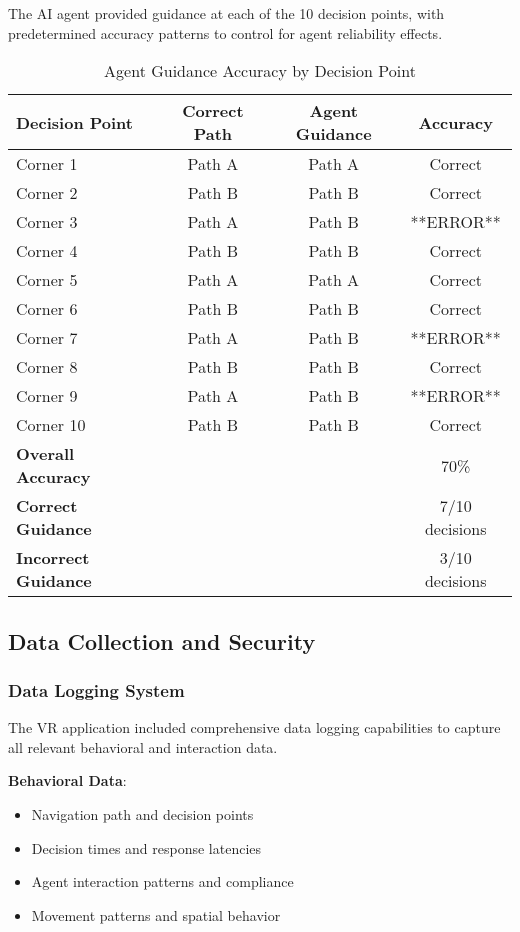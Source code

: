 \documentclass[12pt]{article}
\begin{document}
The AI agent provided guidance at each of the 10 decision points, with predetermined accuracy patterns to control for agent reliability effects.

\begin{table}[h]
\centering
\caption{Agent Guidance Accuracy by Decision Point}
\begin{tabular}{@{}lccc@{}}
\toprule
\textbf{Decision Point} & \textbf{Correct Path} & \textbf{Agent Guidance} & \textbf{Accuracy} \\
\midrule
Corner 1 & Path A & Path A & Correct \\
Corner 2 & Path B & Path B & Correct \\
Corner 3 & Path A & Path B & **ERROR** \\
Corner 4 & Path B & Path B & Correct \\
Corner 5 & Path A & Path A & Correct \\
Corner 6 & Path B & Path B & Correct \\
Corner 7 & Path A & Path B & **ERROR** \\
Corner 8 & Path B & Path B & Correct \\
Corner 9 & Path A & Path B & **ERROR** \\
Corner 10 & Path B & Path B & Correct \\
\midrule
\textbf{Overall Accuracy} & & & 70\% \\
\textbf{Correct Guidance} & & & 7/10 decisions \\
\textbf{Incorrect Guidance} & & & 3/10 decisions \\
\bottomrule
\end{tabular}
\end{table}

\subsection{Data Collection and Security}

\subsubsection{Data Logging System}

The VR application included comprehensive data logging capabilities to capture all relevant behavioral and interaction data.

\textbf{Behavioral Data}:
\begin{itemize}
    \item Navigation path and decision points
    \item Decision times and response latencies
    \item Agent interaction patterns and compliance
    \item Movement patterns and spatial behavior
\end{itemize}
\end{document}
